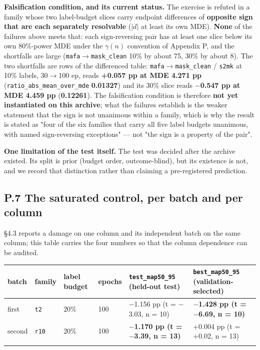 \documentclass[pdflatex,sn-mathphys-ay]{sn-jnl}
\begin{document}
\textbf{Falsification condition, and its current status.} The exercise is refuted in a family whose two label-budget slices carry endpoint differences of \textbf{opposite sign that are each separately resolvable} ($|d|$ at least its own MDE). \textbf{None} of the failures above meets that: each sign-reversing pair has at least one slice below its own 80\%-power MDE under the $\gamma(n)$ convention of Appendix P, and the shortfalls are large (\texttt{mafa\ensuremath{\rightarrow}mask\_clean} 10\% by about 75, 30\% by about 8). The two shortfalls are rows of the differenced table: \texttt{mafa\ensuremath{\rightarrow}mask\_clean} / \texttt{s2mk} at 10\% labels, 30\ensuremath{\rightarrow}100 ep, reads \textbf{+0.057 pp at MDE 4.271 pp} (\texttt{ratio\_abs\_mean\_over\_mde} \textbf{0.01327}) and its 30\% slice reads \textbf{\ensuremath{-}0.547 pp at MDE 4.459 pp} (\textbf{0.12261}). The falsification condition is therefore \textbf{not yet instantiated on this archive}; what the failures establish is the weaker statement that the sign is not unanimous within a family, which is why the result is stated as "four of the six families that carry all five label budgets unanimous, with named sign-reversing exceptions" --- not "the sign is a property of the pair".

\textbf{One limitation of the test itself.} The test was decided after the archive existed. Its split is prior (budget order, outcome-blind), but its existence is not, and we record that distinction rather than claiming a pre-registered prediction.

\subsection*{P.7 The saturated control, per batch and per column}

\S{}4.3 reports a damage on one column and its independent batch on the same column; this table carries the four numbers so that the column dependence can be audited.

{\footnotesize
\setlength{\tabcolsep}{4pt}
\begin{longtable}{p{}p{}p{}p{}p{}p{}}
\toprule
batch & family & label budget & epochs & \texttt{test\_map50\_95} (held-out test) & \texttt{best\_map50\_95} (validation-selected) \\
\midrule
\endhead
first & \texttt{t2} & 20\% & 100 & \ensuremath{-}1.156 pp (t = \ensuremath{-}3.03, n = 10) & \textbf{\ensuremath{-}1.428 pp (t = \ensuremath{-}6.69, n = 10)} \\
second & \texttt{r10} & 20\% & 100 & \textbf{\ensuremath{-}1.170 pp (t = \ensuremath{-}3.39, n = 13)} & +0.004 pp (t = +0.02, n = 13) \\
\botrule
\end{longtable}}
\end{document}
